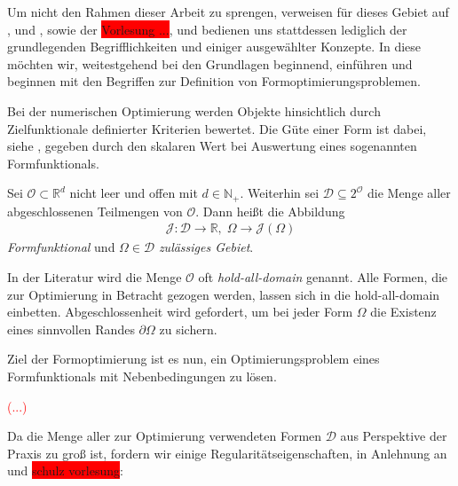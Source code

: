 Um nicht den Rahmen dieser Arbeit zu sprengen, verweisen für dieses Gebiet auf \cite{riemann}, \cite{riemann2} und \cite{shape_space}, sowie der  \colorbox{red}{Vorlesung ...}, und bedienen uns stattdessen lediglich der grundlegenden Begrifflichkeiten und einiger ausgewählter Konzepte. In diese möchten wir, weitestgehend bei den Grundlagen beginnend, einführen und beginnen mit den Begriffen zur Definition von Formoptimierungsproblemen.

Bei der numerischen Optimierung werden Objekte hinsichtlich durch Zielfunktionale definierter Kriterien bewertet. Die Güte einer Form ist dabei, siehe \cite{shape_space}, gegeben durch den skalaren Wert bei Auswertung eines sogenannten Formfunktionals.

\begin{defi}[Formfunktional] %
Sei $\mathcal{O}\subset \mathbb{R}^d$ nicht leer und offen mit $d \in \mathbb{N}_+$. Weiterhin sei $\mathcal{D} \subseteq 2^{\mathcal{O}}$ die Menge aller abgeschlossenen Teilmengen von $\mathcal{O}$. Dann heißt die Abbildung 
\begin{align*}
\mathcal{J}: \mathcal{D} \rightarrow \mathbb{R},\; \Omega \rightarrow \mathcal{J}(\Omega)
\end{align*}
\textit{Formfunktional} und $\Omega \in \mathcal{D}$ \textit{zulässiges Gebiet}.
\end{defi}

In der Literatur wird die Menge $\mathcal{O}$ oft \textit{hold-all-domain} genannt. Alle Formen, die zur Optimierung in Betracht gezogen werden, lassen sich in die hold-all-domain einbetten. Abgeschlossenheit wird gefordert, um bei jeder Form $\Omega$ die Existenz eines sinnvollen Randes $\partial\Omega$ zu sichern. 

Ziel der Formoptimierung ist es nun, ein Optimierungsproblem eines Formfunktionals mit Nebenbedingungen zu lösen.

\textcolor{red}{(...)}

Da die Menge aller zur Optimierung verwendeten Formen $\mathcal{D}$ aus Perspektive der Praxis zu groß ist, fordern wir einige Regularitätseigenschaften, in Anlehnung an \cite{Shape_diff} und \colorbox{red}{schulz vorlesung}:

